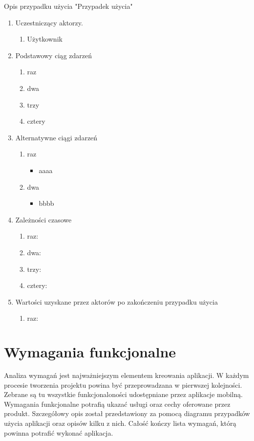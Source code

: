 Opis przypadku użycia "Przypadek użycia"

\begin {enumerate}
\item Uczestniczący aktorzy.
\begin {enumerate}
\item Użytkownik
\end {enumerate}
\item Podstawowy ciąg zdarzeń
\begin {enumerate}
\item raz
\item dwa
\item trzy
\item cztery
\end {enumerate}
\item Alternatywne ciągi zdarzeń
\begin {enumerate}
\item raz
\begin {itemize}
\item aaaa
\end {itemize}
\item dwa
\begin {itemize}
\item bbbb
\end {itemize}
\end {enumerate}
\item Zależności czasowe
\begin {enumerate}
\item raz:
\item dwa:
\item trzy:
\item cztery:
\end {enumerate}
\item Wartości uzyskane przez aktorów po zakończeniu przypadku użycia
\begin {enumerate}
\item raz:
\end {enumerate}
\end {enumerate}

\section{Wymagania funkcjonalne}

Analiza wymagań jest najważniejszym elementem kreowania aplikacji. W każdym procesie tworzenia projektu powina być przeprowadzana w pierwszej kolejności. Zebrane są tu wszystkie funkcjonaloności udostępniane przez aplikacje mobilną. Wymagania funkcjonalne potrafią ukazać usługi oraz cechy oferowane przez produkt. Szczegółowy opis został przedstawiony za pomocą diagramu przypadków użycia aplikacji oraz opisów kilku z nich. Całość kończy lista wymagań, którą powinna potrafić wykonać aplikacja.

